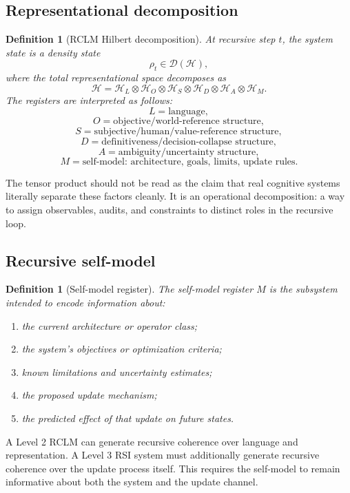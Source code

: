 \documentclass[11pt]{article}
\newtheorem{definition}[theorem]{Definition}
\newcommand{\D}{\mathcal{D}}
\newcommand{\Hcal}{\mathcal{H}}
\newcommand{\1}{\mathbf{1}}
\begin{document}
\subsection{Representational decomposition}

\begin{definition}[RCLM Hilbert decomposition]
At recursive step \(t\), the system state is a density state
\[
\rho_t\in\D(\Hcal),
\]
where the total representational space decomposes as
\[
\Hcal
=
\Hcal_L
\otimes
\Hcal_O
\otimes
\Hcal_S
\otimes
\Hcal_D
\otimes
\Hcal_A
\otimes
\Hcal_M.
\]
The registers are interpreted as follows:
\[
L=\text{language},
\]
\[
O=\text{objective/world-reference structure},
\]
\[
S=\text{subjective/human/value-reference structure},
\]
\[
D=\text{definitiveness/decision-collapse structure},
\]
\[
A=\text{ambiguity/uncertainty structure},
\]
\[
M=\text{self-model: architecture, goals, limits, update rules}.
\]
\end{definition}

The tensor product should not be read as the claim that real cognitive systems literally separate these factors cleanly. It is an operational decomposition: a way to assign observables, audits, and constraints to distinct roles in the recursive loop.

\subsection{Recursive self-model}

\begin{definition}[Self-model register]
The self-model register \(M\) is the subsystem intended to encode information about:
\begin{enumerate}[label=(\alph*)]
    \item the current architecture or operator class;
    \item the system's objectives or optimization criteria;
    \item known limitations and uncertainty estimates;
    \item the proposed update mechanism;
    \item the predicted effect of that update on future states.
\end{enumerate}
\end{definition}

A Level 2 RCLM can generate recursive coherence over language and representation. A Level 3 RSI system must additionally generate recursive coherence over the update process itself. This requires the self-model to remain informative about both the system and the update channel.
\end{document}
